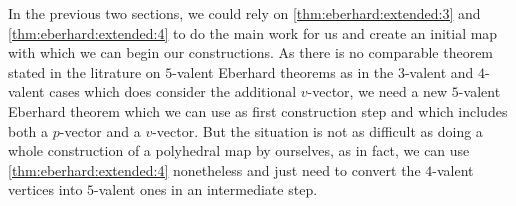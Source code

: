 \label{sec:3:5}

In the previous two sections, we could rely on \autoref{thm:eberhard:extended:3} and \autoref{thm:eberhard:extended:4} to do the main work for us and create an initial map with which we can begin our constructions. As there is no comparable theorem stated in the litrature on $5$-valent {\sc Eberhard} theorems as in the $3$-valent and $4$-valent cases which does consider the additional $v$-vector, we need a new $5$-valent {\sc Eberhard} theorem which we can use as first construction step and which includes both a $p$-vector and a $v$-vector. But the situation is not as difficult as doing a whole construction of a polyhedral map by ourselves, as in fact, we can use \autoref{thm:eberhard:extended:4} nonetheless and just need to convert the $4$-valent vertices into $5$-valent ones in an intermediate step.
\clearpage

